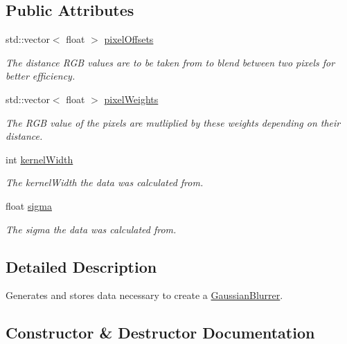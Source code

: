 \subsection*{Public Attributes}
\begin{DoxyCompactItemize}
\item 
std\+::vector$<$ float $>$ \hyperlink{classlighting_1_1GaussianKernelData_a2a8a08e1eb8b4e5f0c8bf42868cb8bc1}{pixel\+Offsets}
\begin{DoxyCompactList}\small\item\em The distance R\+GB values are to be taken from to blend between two pixels for better efficiency. \end{DoxyCompactList}\item 
std\+::vector$<$ float $>$ \hyperlink{classlighting_1_1GaussianKernelData_a623d6a4fd0d92cee09f20020963fe468}{pixel\+Weights}
\begin{DoxyCompactList}\small\item\em The R\+GB value of the pixels are mutliplied by these weights depending on their distance. \end{DoxyCompactList}\item 
int \hyperlink{classlighting_1_1GaussianKernelData_aa01d75bd479cc39c0ccc25f8ac8c015b}{kernel\+Width}
\begin{DoxyCompactList}\small\item\em The kernel\+Width the data was calculated from. \end{DoxyCompactList}\item 
float \hyperlink{classlighting_1_1GaussianKernelData_ac99c7370fa30896baef2f03c91dd6885}{sigma}
\begin{DoxyCompactList}\small\item\em The sigma the data was calculated from. \end{DoxyCompactList}\end{DoxyCompactItemize}


\subsection{Detailed Description}
Generates and stores data necessary to create a \hyperlink{classlighting_1_1GaussianBlurrer}{Gaussian\+Blurrer}. 



\subsection{Constructor \& Destructor Documentation}
